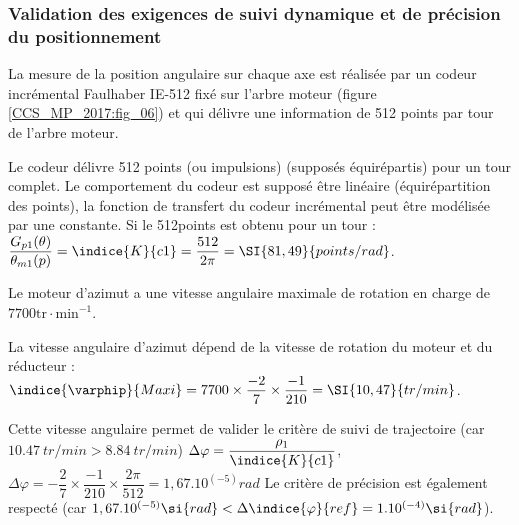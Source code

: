 \subsubsection{ Validation des exigences de suivi dynamique et de précision du positionnement}
La mesure de la position angulaire sur chaque axe est réalisée par un codeur incrémental Faulhaber IE-512 fixé sur l'arbre moteur (figure \ref{CCS_MP_2017:fig_06}) et qui délivre une information de 512 points par tour de l'arbre moteur.\\

\ifprof
\begin{corrige}
Le codeur délivre 512 points (ou impulsions) (supposés équirépartis) pour un tour complet. Le comportement du codeur est supposé être linéaire (équirépartition des points), la fonction de transfert du codeur incrémental peut être modélisée par une constante. Si le 512\ieme  points est obtenu pour un tour :
$\dfrac{G_{p1}  (\theta)}{\theta_{m1}  (p)}=\indice{K}{c1} =\dfrac{512}{2\pi} =\SI{81,49}{points/rad}$. 

\end{corrige}
\else
\fi

Le moteur d'azimut a une vitesse angulaire maximale de rotation en charge de $7700 \mathrm{tr} \cdot \mathrm{min}^{-1}$.\\

\ifprof
\begin{corrige}
La vitesse angulaire d’azimut dépend de la vitesse de rotation du moteur et du réducteur : 
$\indice{\varphip}{Maxi} = 7 700 \times \dfrac{-2}{7}\times \dfrac{-1}{210} =\SI{10,47}{tr/min}$.

Cette vitesse angulaire permet de valider le critère de suivi de trajectoire (car $\SI{10,47}{tr/min}>\SI{8,84}{tr/min}$)
$\Delta\varphi= \dfrac{\rho_1}{\indice{K}{c1}}$, $\Delta\varphi= -\dfrac{2}{7}\times \dfrac{-1}{210}\times\dfrac{2  \pi}{512}=1,67.10^{(-5)}\si{rad}$  
Le critère de précision est également respecté (car $1,67.10^{(-5)}\si{rad} <\Delta\indice{\varphi}{ref}=1.10^{(-4)} \si{rad}$).

\end{corrige}
\else
\fi


